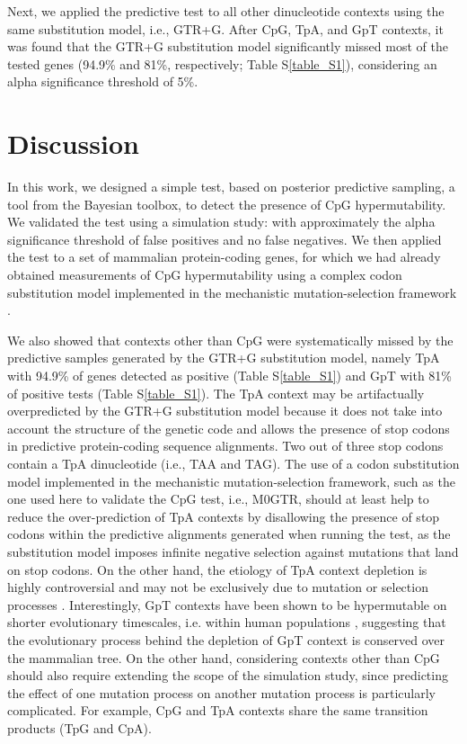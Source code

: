 \documentclass{article}
\begin{document}
Next, we applied the predictive test to all other dinucleotide contexts using the same substitution model, i.e., GTR+G. After CpG, TpA, and GpT contexts, it was found that the GTR+G substitution model significantly missed most of the tested genes (94.9\% and 81\%, respectively; Table S\ref{table_S1}), considering an alpha significance threshold of 5\%.

\section*{Discussion}
In this work, we designed a simple test, based on posterior predictive sampling, a tool from the Bayesian toolbox, to detect the presence of CpG hypermutability. We validated the test using a simulation study: with approximately the alpha significance threshold of false positives and no false negatives. We then applied the test to a set of mammalian protein-coding genes, for which we had already obtained measurements of CpG hypermutability using a complex codon substitution model implemented in the mechanistic mutation-selection framework \citep{LaurinLemay2018b}.

We also showed that contexts other than CpG were systematically missed by the predictive samples generated by the GTR+G substitution model, namely TpA with 94.9\% of genes detected as positive (Table S\ref{table_S1}) and GpT with 81\% of positive tests (Table S\ref{table_S1}). The TpA context may be artifactually overpredicted by the GTR+G substitution model because it does not take into account the structure of the genetic code and allows the presence of stop codons in predictive protein-coding sequence alignments. Two out of three stop codons contain a TpA dinucleotide (i.e., TAA and TAG). The use of a codon substitution model implemented in the mechanistic mutation-selection framework, such as the one used here to validate the CpG test, i.e., M0GTR, should at least help to reduce the over-prediction of TpA contexts by disallowing the presence of stop codons within the predictive alignments generated when running the test, as the substitution model imposes infinite negative selection against mutations that land on stop codons. On the other hand, the etiology of TpA context depletion is highly controversial and may not be exclusively due to mutation or selection processes \citep[e.g.,][]{Duret2000,Simmonds2013}.  Interestingly, GpT contexts have been shown to be hypermutable on shorter evolutionary timescales, i.e. within human populations \citep{Simmonds2013}, suggesting that the evolutionary process behind the depletion of GpT context is conserved over the mammalian tree.  On the other hand, considering contexts other than CpG should also require extending the scope of the simulation study, since predicting the effect of one mutation process on another mutation process is particularly complicated. For example, CpG and TpA contexts share the same transition products (TpG and CpA).
\end{document}
